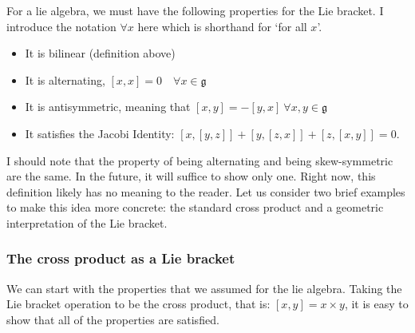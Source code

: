 For a \gls{lie algebra}, we must have the following properties for the Lie bracket. I introduce the notation $\forall x$ here which is shorthand for `for all $x$'.
\begin{itemize}
    \item It is bilinear (definition above)
    \item It is alternating, $[x,x]=0 \quad \forall x\in \mathfrak{g}$
    \item It is antisymmetric, meaning that $[x,y]=-[y,x] \ \forall x, y\in\mathfrak{g}$
    \item It satisfies the Jacobi Identity: $[x,[y,z]]+[y,[z,x]]+[z,[x,y]]=0$.
\end{itemize}

I should note that the property of being alternating and being skew-symmetric are the same. In the future, it will suffice to show only one. Right now, this definition likely has no meaning to the reader. Let us consider two brief examples to make this idea more concrete: the standard cross product and a geometric interpretation of the Lie bracket.


\subsubsection{The cross product as a Lie bracket}
We can start with the properties that we assumed for the \gls{lie algebra}. Taking the Lie bracket operation to be the cross product, that is: $[x,y]=x\times y$, it is easy to show that all of the properties are satisfied.

